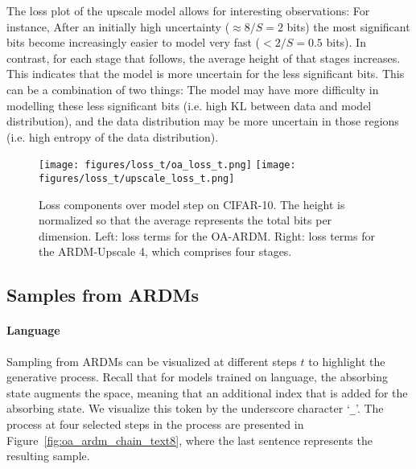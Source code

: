 \documentclass{article} \usepackage{iclr2022_conference,times}
\begin{document}
The loss plot of the upscale model allows for interesting observations: For instance, After an initially high uncertainty ($\approx 8 / S = 2$ bits) the most significant bits become increasingly easier to model very fast ($<2 / S = 0.5$ bits). In contrast, for each stage that follows, the average height of that stages increases. This indicates that the model is more uncertain for the less significant bits. This can be a combination of two things: The model may have more difficulty in modelling these less significant bits (i.e. high $\mathrm{KL}$ between data and model distribution), and the data distribution may be more uncertain in those regions (i.e. high entropy of the data distribution). 
\begin{figure}[H]
    \vspace{-.1cm}
    \centering
    \texttt{[image: figures/loss\_t/oa\_loss\_t.png]} \hfill 
    \texttt{[image: figures/loss\_t/upscale\_loss\_t.png]}
    \vspace{-.3cm}
    \caption{Loss components over model step on CIFAR-10. The height is normalized so that the average represents the total bits per dimension. Left: loss terms for the OA-ARDM. Right: loss terms for the ARDM-Upscale 4, which comprises four stages.}
    \label{fig:loss_t}
    \vspace{-.3cm}
\end{figure}


\subsection{Samples from ARDMs}
\paragraph{Language} Sampling from ARDMs can be visualized at different steps $t$ to highlight the generative process. Recall that for models trained on language, the absorbing state augments the space, meaning that an additional index that is added for the absorbing state. We visualize this token by the underscore character `\texttt{\_}'. The process at four selected steps in the process are presented in Figure~\ref{fig:oa_ardm_chain_text8}, where the last sentence represents the resulting sample.


\end{document}
